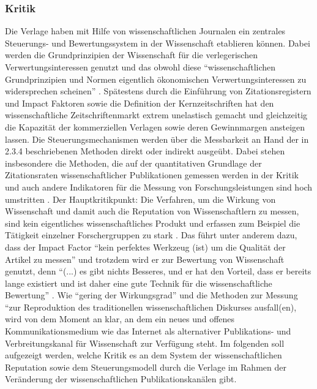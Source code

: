 \subsubsection{Kritik}
Die Verlage haben mit Hilfe von wissenschaftlichen Journalen ein zentrales Steuerungs- und Bewertungssystem in der Wissenschaft etablieren können. Dabei werden die Grundprinzipien der Wissenschaft für die verlegerischen Verwertungsinteressen genutzt und das obwohl diese “wissenschaftlichen Grundprinzipien und Normen eigentlich ökonomischen Verwertungsinteressen zu widersprechen scheinen” . Spätestens durch die Einführung von Zitationsregistern und Impact Faktoren sowie die Definition der Kernzeitschriften hat den wissenschaftliche Zeitschriftenmarkt extrem unelastisch gemacht und gleichzeitig die Kapazität der kommerziellen Verlagen sowie deren Gewinnmargen ansteigen lassen.  Die Steuerungsmechanismen werden über die Messbarkeit an Hand der in 2.3.4 beschriebenen Methoden direkt oder indirekt ausgeübt. Dabei stehen insbesondere die Methoden, die auf der quantitativen Grundlage der Zitationsraten wissenschaftlicher Publikationen gemessen werden in der Kritik  und auch andere Indikatoren  für die Messung von Forschungsleistungen sind hoch umstritten . Der Hauptkritikpunkt: Die Verfahren, um die Wirkung von Wissenschaft und damit auch die Reputation von Wissenschaftlern zu messen, sind kein eigentliches wissenschaftliches Produkt  und erfassen zum Beispiel die Tätigkeit einzelner Forschergruppen zu stark . Das führt unter anderem dazu, dass der Impact Factor “kein perfektes Werkzeug (ist) um die Qualität der Artikel zu messen” und trotzdem wird er zur Bewertung von Wissenschaft genutzt, denn “(...) es gibt nichts Besseres, und er hat den Vorteil, dass er bereits lange existiert und ist daher eine gute Technik für die wissenschaftliche Bewertung” . Wie “gering der Wirkungsgrad” und die Methoden zur Messung “zur Reproduktion des traditionellen wissenschaftlichen Diskurses ausfall(en), wird von dem Moment an klar, an dem ein neues und offenes Kommunikationsmedium wie das Internet als alternativer Publikations- und Verbreitungskanal für Wissenschaft zur Verfügung steht.  Im folgenden soll aufgezeigt werden, welche Kritik es an dem System der wissenschaftlichen Reputation sowie dem Steuerungsmodell durch die Verlage im Rahmen der Veränderung der wissenschaftlichen Publikationskanälen gibt.